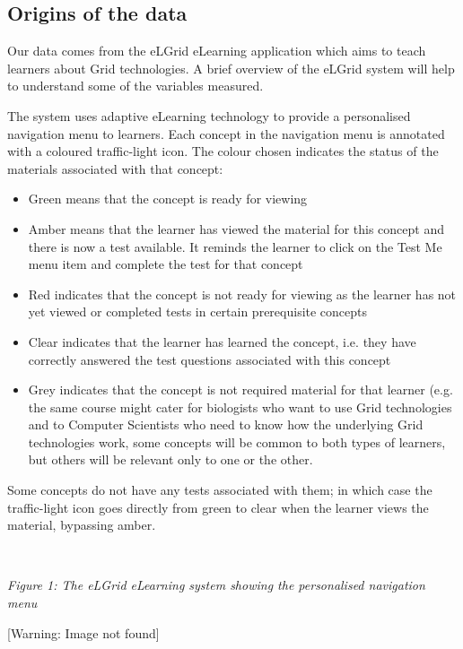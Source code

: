 \documentclass[12pt,twoside]{article}
\newcommand\liststyleLi{%
\renewcommand\labelitemi{{\textbullet}}
\renewcommand\labelitemii{{\textbullet}}
\renewcommand\labelitemiii{{\textbullet}}
\renewcommand\labelitemiv{{\textbullet}}
}
\begin{document}
\subsection[Origins of the data ]{\textrm{Origins of the data} }
Our data comes from the {\textquotedbl}eLGrid{\textquotedbl} eLearning
application which aims to teach learners about Grid technologies. A
brief overview of the eLGrid system will help to understand some of the
variables measured. 

The system uses adaptive eLearning technology to provide a personalised
navigation menu to learners. Each concept in the navigation menu is
annotated with a coloured {\textquotedbl}traffic{}-light{\textquotedbl}
icon. The colour chosen indicates the status of the materials
associated with that concept: 

\liststyleLi
\begin{itemize}
\item Green means that the concept is ready for viewing 
\item Amber means that the learner has viewed the material for this
concept and there is now a test available. It reminds the learner to
click on the {\textquotedbl}Test Me{\textquotedbl} menu item and
complete the test for that concept 
\item Red indicates that the concept is not ready for viewing as the
learner has not yet viewed or completed tests in certain prerequisite
concepts 
\item Clear indicates that the learner has
{\textquotedbl}learned{\textquotedbl} the concept, i.e. they have
correctly answered the test questions associated with this concept 
\item Grey indicates that the concept is not required material for that
learner (e.g. the same course might cater for biologists who want to
use Grid technologies and to Computer Scientists who need to know how
the underlying Grid technologies work, some concepts will be common to
both types of learners, but others will be relevant only to one or the
other. 
\end{itemize}
Some concepts do not have any tests associated with them; in which case
the traffic{}-light icon goes directly from green to clear when the
learner views the material, bypassing amber. 

~ 

\textit{Figure 1: The eLGrid eLearning system showing the personalised
navigation menu} 

\begin{center}
[Warning: Image not found]
\end{center}
\newline
\end{document}
